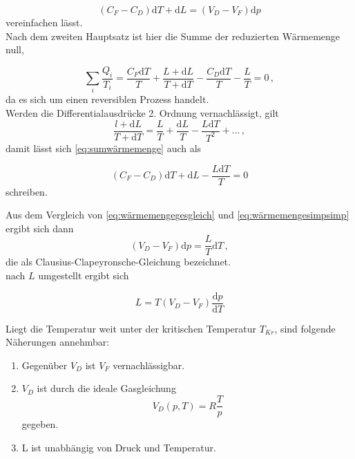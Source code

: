 \begin{equation}
    (C_F - C_D) \mathrm{d}T + \mathrm{d}L = (V_D - V_F) \mathrm{d}p
    \label{eq:wärmemengegesgleich}
\end{equation} vereinfachen lässt. \\

Nach dem zweiten Hauptsatz ist hier die Summe der reduzierten Wärmemenge null,

\begin{equation}
    \sum_i \frac{Q_i}{T_i} = \frac{C_F \mathrm{d}T}{T} + \frac{L + \mathrm{d}L}{T + \mathrm{d}T} - \frac{C_D \mathrm{d}T}{T} - \frac{L}{T} = 0 \,,
    \label{eq:sumwärmemenge}
\end{equation} da es sich um einen reversiblen Prozess handelt. \\

Werden die Differentialausdrücke 2. Ordnung vernachlässigt, gilt
\begin{equation*}
    \frac{l + \mathrm{d}L}{T + \mathrm{d}T} = \frac{L}{T} + \frac{\mathrm{d}L}{T} - \frac{L \mathrm{d}T}
    {T^2} + ... \,,
    \label{eq:sumwärmemengesimp}
\end{equation*} damit lässt sich \eqref{eq:sumwärmemenge} auch als

\begin{equation}
    (C_F - C_D) \mathrm{d}T + \mathrm{d}L - \frac{L \mathrm{d}T}{T} = 0 
    \label{eq:wärmemengesimpsimp}
\end{equation} schreiben.

Aus dem Vergleich von \eqref{eq:wärmemengegesgleich} und \eqref{eq:wärmemengesimpsimp} ergibt sich dann
\begin{equation*}
    (V_D - V_F) \mathrm{d}p = \frac{L}{T} \mathrm{d}T \,,
    \label{eq:clausiusclapeyronschegleichung}
\end{equation*} die als Clausius-Clapeyronsche-Gleichung bezeichnet. \\

nach $L$ umgestellt ergibt sich

\begin{equation}
    L = T(V_D - V_F) \frac{\mathrm{d}p}{\mathrm{d}T}
    \label{eq:clauclapL}
\end{equation}

Liegt die Temperatur weit unter der kritischen Temperatur $T_{Kr}$, sind folgende Näherungen annehmbar:
\begin{enumerate}
    \item Gegenüber $V_D$ ist $V_F$ vernachlässigbar.
    \item $V_D$ ist durch die ideale Gasgleichung 
    \begin{equation*}
        V_D(p,T) = R \frac{T}{p}
    \end{equation*} gegeben.
    \item L ist unabhängig von Druck und Temperatur.
\end{enumerate}

